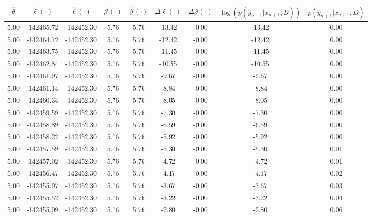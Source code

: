 \begin{table}[htbp]
        \centering
        \tiny
        \begin{adjustbox}{angle=90}
            \begin{tabular}{|c|c|c|c|c|c|c|c|c|}
                \hline
                 $\hat{\theta}$ & $\tilde{\ell}(\cdot)$ & $\hat{\ell}(\cdot)$ & $\tilde{\mathcal{J}}(\cdot)$ & $\hat{\mathcal{J}}(\cdot)$ & $\Delta \ell(\cdot)$ & $\Delta \mathcal{J}(\cdot)$ & $\log(p(\hat{y}_{n+1}|x_{n+1}, D))$ & $p(\hat{y}_{n+1}|x_{n+1}, D)$ \\
                \hline
                 5.00 & -142465.72 & -142452.30 & 5.76 & 5.76 & -13.42 & -0.00 & -13.42 & 0.00\\ \hline
 5.00 & -142464.72 & -142452.30 & 5.76 & 5.76 & -12.42 & -0.00 & -12.42 & 0.00\\ \hline
 5.00 & -142463.75 & -142452.30 & 5.76 & 5.76 & -11.45 & -0.00 & -11.45 & 0.00\\ \hline
 5.00 & -142462.84 & -142452.30 & 5.76 & 5.76 & -10.55 & -0.00 & -10.55 & 0.00\\ \hline
 5.00 & -142461.97 & -142452.30 & 5.76 & 5.76 & -9.67 & -0.00 & -9.67 & 0.00\\ \hline
 5.00 & -142461.14 & -142452.30 & 5.76 & 5.76 & -8.84 & -0.00 & -8.84 & 0.00\\ \hline
 5.00 & -142460.34 & -142452.30 & 5.76 & 5.76 & -8.05 & -0.00 & -8.05 & 0.00\\ \hline
 5.00 & -142459.59 & -142452.30 & 5.76 & 5.76 & -7.30 & -0.00 & -7.30 & 0.00\\ \hline
 5.00 & -142458.89 & -142452.30 & 5.76 & 5.76 & -6.59 & -0.00 & -6.59 & 0.00\\ \hline
 5.00 & -142458.22 & -142452.30 & 5.76 & 5.76 & -5.92 & -0.00 & -5.92 & 0.00\\ \hline
 5.00 & -142457.59 & -142452.30 & 5.76 & 5.76 & -5.30 & -0.00 & -5.30 & 0.01\\ \hline
 5.00 & -142457.02 & -142452.30 & 5.76 & 5.76 & -4.72 & -0.00 & -4.72 & 0.01\\ \hline
 5.00 & -142456.47 & -142452.30 & 5.76 & 5.76 & -4.17 & -0.00 & -4.17 & 0.02\\ \hline
 5.00 & -142455.97 & -142452.30 & 5.76 & 5.76 & -3.67 & -0.00 & -3.67 & 0.03\\ \hline
 5.00 & -142455.52 & -142452.30 & 5.76 & 5.76 & -3.22 & -0.00 & -3.22 & 0.04\\ \hline
 5.00 & -142455.09 & -142452.30 & 5.76 & 5.76 & -2.80 & -0.00 & -2.80 & 0.06\\ \hline

\end{tabular}
\end{adjustbox}
\end{table}
